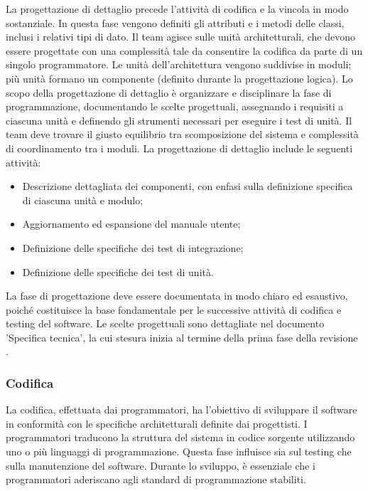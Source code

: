 \label{progettazione-dettaglio}
\par La progettazione di dettaglio precede l’attività di codifica e la vincola in modo sostanziale. In questa fase vengono definiti gli attributi e i metodi delle classi, inclusi i relativi tipi di dato. Il team agisce sulle unità architetturali, che devono essere progettate con una complessità tale da consentire la codifica da parte di un singolo programmatore. Le unità dell’architettura vengono suddivise in moduli; più unità formano un componente (definito durante la progettazione logica). Lo scopo della progettazione di dettaglio è organizzare e disciplinare la fase di programmazione, documentando le scelte progettuali, assegnando i requisiti a ciascuna unità e definendo gli strumenti necessari per eseguire i test di unità. Il team deve trovare il giusto equilibrio tra scomposizione del sistema e complessità di coordinamento tra i moduli. La progettazione di dettaglio include le seguenti attività:
\begin{itemize}
  \item Descrizione dettagliata dei componenti, con enfasi sulla definizione specifica di ciascuna unità e modulo;
  \item Aggiornamento ed espansione del manuale utente;
  \item Definizione delle specifiche dei test di integrazione;
  \item Definizione delle specifiche dei test di unità.
\end{itemize}

\label{specifica-tecnica}
\par La fase di progettazione deve essere documentata in modo chiaro ed esaustivo, poiché costituisce la base fondamentale per le successive attività di codifica e testing del software. Le scelte progettuali sono dettagliate nel documento 'Specifica tecnica', la cui stesura inizia al termine della prima fase della revisione .

\subsubsection{Codifica}\label{codifica}

\par La codifica, effettuata dai programmatori, ha l'obiettivo di sviluppare il software in conformità con le specifiche architetturali definite dai progettisti. I programmatori traducono la struttura del sistema in codice sorgente utilizzando uno o più linguaggi di programmazione. Questa fase influisce sia sul testing che sulla manutenzione del software. Durante lo sviluppo, è essenziale che i programmatori aderiscano agli standard di programmazione stabiliti.

